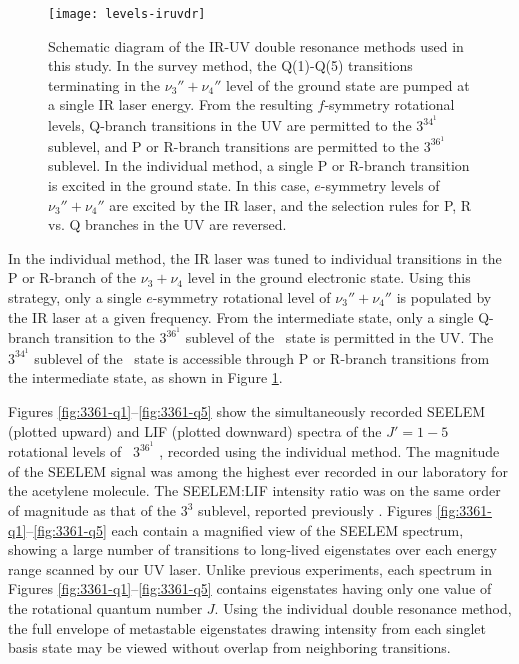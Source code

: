 \documentclass[12pt]{mitthesis}
\begin{document}
\begin{figure}
  \centering
  
  \texttt{[image: levels-iruvdr]}

  \caption{Schematic diagram of the IR-UV double resonance methods
    used in this study.  In the survey method, the Q(1)-Q(5)
    transitions terminating in the $\nu_3''+\nu_4''$ level of the
    ground state are pumped at a single IR laser energy.  From the
    resulting $f$-symmetry rotational levels, Q-branch transitions in
    the UV are permitted to the $3^34^1$  sublevel, and P or
    R-branch transitions are permitted to the $3^36^1$ 
    sublevel.  In the individual method, a single P or R-branch
    transition is excited in the ground state.  In this case,
    $e$-symmetry levels of $\nu_3''+\nu_4''$ are excited by the IR
    laser, and the selection rules for P, R vs. Q branches in the UV
    are reversed.}
  \label{fig:levels-iruvdr}
\end{figure}

In the individual method, the IR laser was tuned to individual
transitions in the P or R-branch of the $\nu_3+\nu_4$ level in the
ground electronic state.  Using this strategy, only a single
$e$-symmetry rotational level of $\nu_3''+\nu_4''$ is populated by the
IR laser at a given frequency.  From the intermediate state, only a
single Q-branch transition to the $3^36^1$  sublevel of the
\astate\ state is permitted in the UV.  The $3^34^1$  sublevel
of the \astate\ state is accessible through P or R-branch transitions
from the intermediate state, as shown in Figure
\ref{fig:levels-iruvdr}.


Figures \ref{fig:3361-q1}--\ref{fig:3361-q5} show the simultaneously
recorded SEELEM (plotted upward) and LIF (plotted downward) spectra of
the $J'=1-5$ rotational levels of \astate\ $3^36^1$ , recorded
using the individual method.  The magnitude of the SEELEM signal was
among the highest ever recorded in our laboratory for the acetylene
molecule. The SEELEM:LIF intensity ratio was on the same order of
magnitude as that of the $3^3$  sublevel, reported previously
\cite{mishra04}. Figures \ref{fig:3361-q1}--\ref{fig:3361-q5} each
contain a magnified view of the SEELEM spectrum, showing a large
number of transitions to long-lived eigenstates over each energy range
scanned by our UV laser.  Unlike previous experiments, each spectrum
in Figures \ref{fig:3361-q1}--\ref{fig:3361-q5} contains eigenstates
having only one value of the rotational quantum number $J$.  Using the
individual double resonance method, the full envelope of metastable
eigenstates drawing intensity from each singlet basis state may be
viewed without overlap from neighboring transitions.
\end{document}
